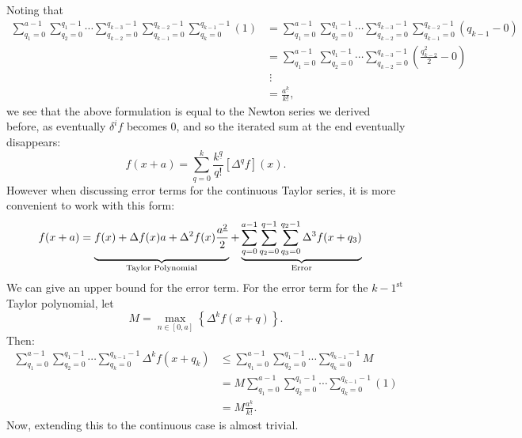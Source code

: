 \documentclass{article}
\theoremstyle{definition}
\begin{document}
Noting that 
\begin{align*}
	\sum_{q_1=0}^{a-1}\sum_{q_2=0}^{q_1-1}\cdots\sum_{q_{k-2}=0}^{q_{k-3}-1}\sum_{q_{k-1}=0}^{q_{k-2}-1}\sum_{q_k=0}^{q_{k-1}-1}(1)&=\sum_{q_1=0}^{a-1}\sum_{q_2=0}^{q_1-1}\cdots\sum_{q_{k-2}=0}^{q_{k-3}-1}\sum_{q_{k-1}=0}^{q_{k-2}-1}(q_{k-1}-0)\\
	&=\sum_{q_1=0}^{a-1}\sum_{q_2=0}^{q_1-1}\cdots\sum_{q_{k-2}=0}^{q_{k-3}-1}(\frac{q_{k-2}^{\underline{2}}}{2}-0)\\
	&\;\vdots\\
	&=\frac{a^{\underline{k}}}{k!},
\end{align*}
we see that the above formulation is equal to the Newton series we derived before, as eventually $\delta^if$ becomes 0, and so the iterated sum at the end eventually disappears:
\[f(x+a)=\sum_{q=0}^k\frac{k^{\underline{q}}}{q!}[\Delta^qf](x).\]
However when discussing error terms for the continuous Taylor series, it is more convenient to work with this form:
\begin{align*}
	f(x+a)&=\underbrace{\vphantom{\sum_{q=0}^{a-1}}f(x)+\Delta f(x)a+\Delta^2f(x)\frac{a^{\underline{2}}}{2}}_{\text{\normalfont Taylor Polynomial}}+\underbrace{\sum_{q=0}^{a-1}\sum_{q_2=0}^{q-1}\sum_{q_3=0}^{q_2-1}\Delta^3f(x+q_3)}_{\text{\normalfont Error}}
\end{align*}
We can give an upper bound for the error term. For the error term for the $k-1^\text{st}$ Taylor polynomial, let \[M=\max_{n\in[0,a]}\left\{\Delta^kf(x+q)\right\}.\] Then:
\begin{align*}
	\sum_{q_1=0}^{a-1}\sum_{q_2=0}^{q_1-1}\cdots\sum_{q_k=0}^{q_{k-1}-1}\Delta^kf(x+q_k)&\leq\sum_{q_1=0}^{a-1}\sum_{q_2=0}^{q_1-1}\cdots\sum_{q_k=0}^{q_{k-1}-1}M\\
	&=M\sum_{q_1=0}^{a-1}\sum_{q_2=0}^{q_1-1}\cdots\sum_{q_k=0}^{q_{k-1}-1}(1)\\
	&=M\frac{a^{\underline{k}}}{k!}.
\end{align*}
Now, extending this to the continuous case is almost trivial.
\end{document}
